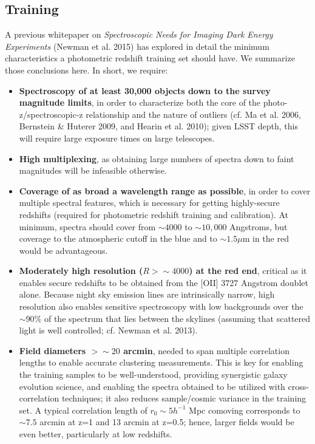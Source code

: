 \label{sec:design}

\subsection{Training}

A previous whitepaper on {\it Spectroscopic Needs for Imaging Dark Energy Experiments} (Newman et al. 2015) has explored in detail the minimum characteristics a photometric redshift training set should have.  We summarize those conclusions here.  In short, we require:

\begin{itemize}

\item {\bf Spectroscopy of at least 30,000 objects down to the survey magnitude limits}, in order to characterize both the core of the photo-z/spectroscopic-z relationship and the nature of outliers (cf. Ma et al. 2006, Bernstein \& Huterer 2009, and Hearin et al. 2010); given LSST depth, this will require large exposure times on large telescopes.

\item {\bf High multiplexing}, as obtaining large numbers of spectra down to faint magnitudes will be infeasible otherwise.

\item {\bf Coverage of as broad a wavelength range as possible}, in order to cover multiple spectral features, which is necessary for getting highly-secure redshifts (required for photometric redshift training and calibration).  At minimum, spectra should cover from $\sim 4000$ to $\sim 10,000$ Angstroms, but coverage to the atmospheric cutoff in the blue and to $\sim 1.5\mu$m in the red would be advantageous.

\item {\bf Moderately high resolution ($R>\sim 4000$) at the red end}, critical as it enables secure redshifts to be obtained from the [OII] 3727 Angstrom doublet alone.  Because night sky emission lines are intrinsically narrow, high resolution also enables sensitive spectroscopy with low backgrounds over the $\sim 90\%$ of the spectrum that lies between the skylines (assuming that scattered light is well controlled; cf. Newman et al. 2013).

\item {\bf Field diameters $>\sim20$ arcmin}, needed to span multiple correlation lengths to enable accurate clustering measurements.  This is key for enabling the training samples to be well-understood, providing synergistic galaxy evolution science, and enabling the spectra obtained to be utilized with cross-correlation techniques; it also reduces sample/cosmic variance in the training set.  A typical correlation length of $r_0 \sim 5 h^{-1}$ Mpc comoving corresponds to $\sim 7.5$ arcmin at z=1 and 13 arcmin at z=0.5; hence, larger fields would be even better, particularly at low redshifts.


\end{itemize}
